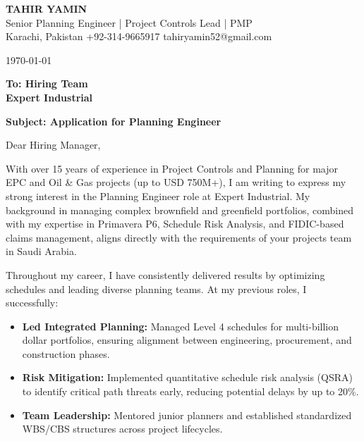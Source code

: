 \documentclass[11pt,a4paper]{article}
\begin{document}
\begin{center}
    {\Huge \textbf{\color{awesome-darknight} TAHIR YAMIN}} \\[0.2cm]
    {\Large \color{awesome-gray} Senior Planning Engineer | Project Controls Lead | PMP} \\[0.3cm]
    
    \small \color{light-gray}
    Karachi, Pakistan \quad \textbullet \quad 
    +92-314-9665917 \quad \textbullet \quad 
    tahiryamin52@gmail.com
\end{center}

\vspace{0.8cm}
\today
\vspace{0.5cm}

\textbf{To: Hiring Team} \\
\textbf{Expert Industrial} \\
\vspace{0.5cm}

\textbf{Subject: Application for Planning Engineer}

\vspace{0.5cm}

Dear Hiring Manager,

With over 15 years of experience in Project Controls and Planning for major EPC and Oil \& Gas projects (up to USD 750M+), I am writing to express my strong interest in the Planning Engineer role at Expert Industrial. My background in managing complex brownfield and greenfield portfolios, combined with my expertise in Primavera P6, Schedule Risk Analysis, and FIDIC-based claims management, aligns directly with the requirements of your projects team in Saudi Arabia.

Throughout my career, I have consistently delivered results by optimizing schedules and leading diverse planning teams. At my previous roles, I successfully:

\begin{itemize}
    \item \textbf{Led Integrated Planning:} Managed Level 4 schedules for multi-billion dollar portfolios, ensuring alignment between engineering, procurement, and construction phases.
    \item \textbf{Risk Mitigation:} Implemented quantitative schedule risk analysis (QSRA) to identify critical path threats early, reducing potential delays by up to 20\%.
    \item \textbf{Team Leadership:} Mentored junior planners and established standardized WBS/CBS structures across project lifecycles.
\end{itemize}
\end{document}
